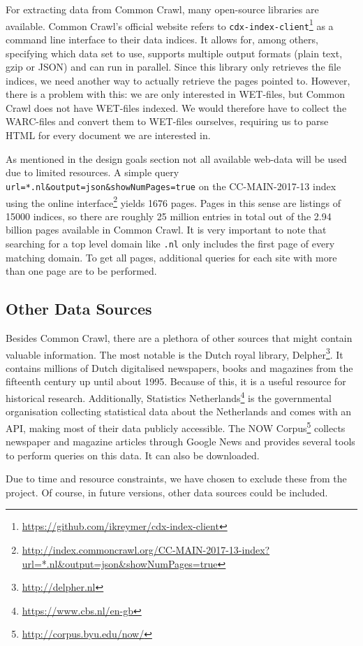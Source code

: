 For extracting data from Common Crawl, many open-source libraries are available. Common Crawl's official website refers to \texttt{cdx-index-client}\footnote{\url{https://github.com/ikreymer/cdx-index-client}} as a command line interface to their data indices. It allows for, among others, specifying which data set to use, supports multiple output formats (plain text, gzip or JSON) and can run in parallel. Since this library only retrieves the file indices, we need another way to actually retrieve the pages pointed to. However, there is a problem with this: we are only interested in WET-files, but Common Crawl does not have WET-files indexed. We would therefore have to collect the WARC-files and convert them to WET-files ourselves, requiring us to parse HTML for every document we are interested in.

As mentioned in the design goals section not all available web-data will be used due to limited resources. A simple query \texttt{url=*.nl\&output=json\&showNumPages=true} on the CC-MAIN-2017-13 index using the online interface\footnote{\url{http://index.commoncrawl.org/CC-MAIN-2017-13-index?url=*.nl\&output=json\&showNumPages=true}} yields 1676 pages. Pages in this sense are listings of 15000 indices, so there are roughly 25 million entries in total out of the 2.94 billion pages available in Common Crawl. It is very important to note that searching for a top level domain like \texttt{.nl} only includes the first page of every matching domain. To get all pages, additional queries for each site with more than one page are to be performed.



\subsection{Other Data Sources} \label{sec:delpher}
Besides Common Crawl, there are a plethora of other sources that might contain valuable information. The most notable is the Dutch royal library, Delpher\footnote{\url{http://delpher.nl}}. It contains millions of Dutch digitalised newspapers, books and magazines from the fifteenth century up until about 1995. Because of this, it is a useful resource for historical research. Additionally, Statistics Netherlands\footnote{\url{https://www.cbs.nl/en-gb}} is the governmental organisation collecting statistical data about the Netherlands and comes with an API, making most of their data publicly accessible. The NOW Corpus\footnote{\url{http://corpus.byu.edu/now/}} collects newspaper and magazine articles through Google News and provides several tools to perform queries on this data. It can also be downloaded. 

Due to time and resource constraints, we have chosen to exclude these from the project. Of course, in future versions, other data sources could be included.